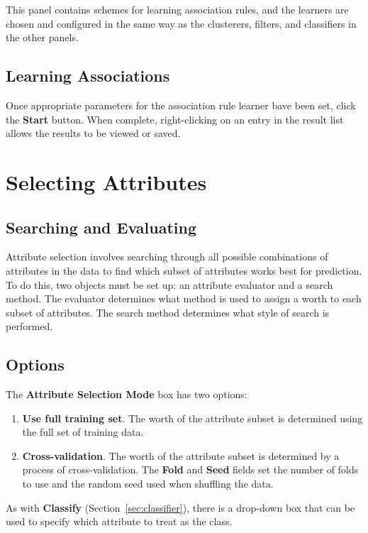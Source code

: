 \documentclass[a4paper]{article}
\begin{document}
This panel contains schemes for learning association rules, and the
learners are chosen and configured in the same way as the clusterers,
filters, and classifiers in the other panels.

\subsection{Learning Associations}

Once appropriate parameters for the association rule learner bave been
set, click the \textbf{Start} button.  When complete, right-clicking
on an entry in the result list allows the results to be viewed or
saved.

\newpage

\section{Selecting Attributes}

\begin{center}
\end{center}

\subsection{Searching and Evaluating}

Attribute selection involves searching through all possible combinations of
attributes in the data to find which subset of attributes works best for
prediction.  To do this, two objects must be set up: an attribute evaluator and
a search method.  The evaluator determines what method is used to assign a
worth to each subset of attributes.  The search method determines what style of
search is performed.

\subsection{Options}

The \textbf{Attribute Selection Mode} box has two options:

\begin{enumerate}
\item \textbf{Use full training set}.
The worth of the attribute subset is determined using the full set of training
data. 
\item \textbf{Cross-validation}.
The worth of the attribute subset is determined by a process of
cross-validation.  The \textbf{Fold} and \textbf{Seed} fields set the number of
folds to use and the random seed used when shuffling the data.
\end{enumerate}
\noindent
As with \textbf{Classify} (Section~\ref{sec:classifier}), there is a drop-down
box that can be used to specify which attribute to treat as the class.
\end{document}
